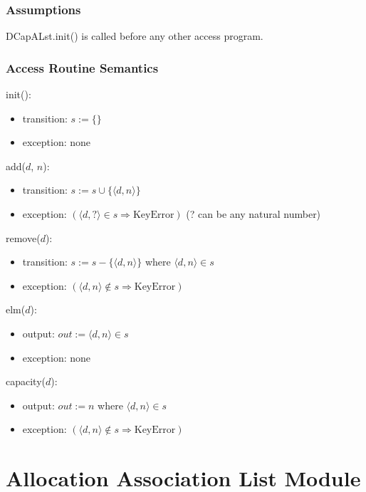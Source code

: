 \documentclass[12pt]{article}
\begin{document}
\subsubsection* {Assumptions}

DCapALst.init() is called before any other access program.

\subsubsection* {Access Routine Semantics}

\noindent init():
\begin{itemize}
\item transition: $s := \{ \}$
\item exception: none
\end{itemize}

\noindent add($d$, $n$):
\begin{itemize}
\item transition: $s := s \cup \{ \langle d, n \rangle \}$
\item exception: $(\langle d, ? \rangle \in s \Rightarrow \text{KeyError} )$
  (? can be any natural number)
\end{itemize}

\noindent remove($d$):
\begin{itemize}
\item transition: $s := s - \{ \langle d, n \rangle \}$ where $\langle d, n
  \rangle \in s$
\item exception: $(\langle d, n \rangle \notin s \Rightarrow \text{KeyError} )$
\end{itemize}

\noindent elm($d$):
\begin{itemize}
\item output: $out := \langle d, n \rangle \in s$
\item exception: none
\end{itemize}

\noindent capacity($d$):
\begin{itemize}
\item output: $out := n$ where $\langle d, n \rangle \in s$
\item exception: $(\langle d, n \rangle \notin s \Rightarrow \text{KeyError} )$
\end{itemize}

\newpage

\section* {Allocation Association List Module}
\end{document}
